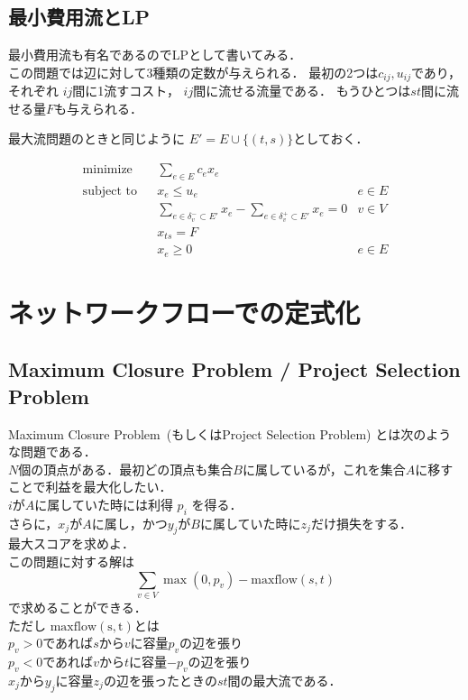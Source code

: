 \documentclass[13pt, a4paper, landscape]{jarticle}
\theoremstyle{nonitalic} %
\begin{document}
\subsection{最小費用流とLP}

最小費用流も有名であるのでLPとして書いてみる． \\
この問題では辺に対して3種類の定数が与えられる． 最初の2つは$c_{ij}, u_{ij}$であり，それぞれ $ij$間に1流すコスト， $ij$間に流せる流量である． 
もうひとつは$st$間に流せる量$F$も与えられる．

最大流問題のときと同じように $E' = E \cup \{ (t,s) \} $としておく．

\begin{align}
 &&&&&\textrm{minimize}   && \sum_{e\in E} c_e x_e  \\
 &&&&&\textrm{subject to} && x_{e} \leq u_e & e  \in E \\
 &&&&&                    && \sum_{e \in \delta_v^-  \subset E'} x_e - \sum_{e \in \delta_v^+  \subset E'} x_e= 0 & v \in V  &&&&& \\
 &&&&&                    && x_{ts} = F \\
 &&&&&                    && x_e \geq 0 & e \in E &&&&&
\end{align}



\section{ネットワークフローでの定式化}
\subsection{Maximum Closure Problem / Project Selection Problem}
Maximum Closure Problem~(もしくはProject Selection Problem) とは次のような問題である．\\

$N$個の頂点がある．最初どの頂点も集合$B$に属しているが，これを集合$A$に移すことで利益を最大化したい． \\
$i$が$A$に属していた時には利得 $p_i$ を得る． \\
さらに，$x_j$が$A$に属し，かつ$y_j$が$B$に属していた時に$z_j$だけ損失をする． \\
最大スコアを求めよ． \\


この問題に対する解は
\[ \sum_{v \in V } \max(0,p_v) - \mathrm{maxflow}(s,t) \]
で求めることができる．\\
ただし $\mathrm{maxflow(s,t)} $とは\\
$p_v>0$であれば$s$から$v$に容量$p_v$の辺を張り\\
$p_v<0$であれば$v$から$t$に容量$-p_v$の辺を張り \\
$x_j$から$y_j$に容量$z_j$の辺を張ったときの$st$間の最大流である．
\end{document}
